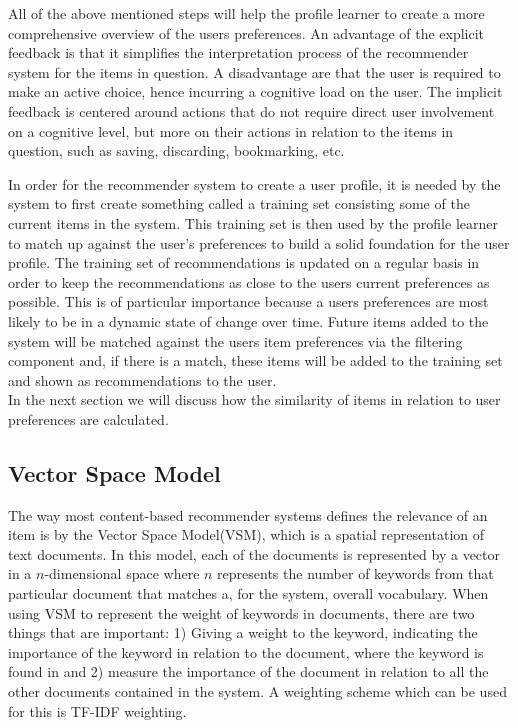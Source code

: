All of the above mentioned steps will help the profile learner to create a more comprehensive overview of the users preferences. An advantage of the explicit feedback is that it simplifies the interpretation process of the recommender system for the items in question. A disadvantage are that the user is required to make an active choice, hence incurring a cognitive load on the user. The implicit feedback is centered around actions that do not require direct user involvement on a cognitive level, but more on their actions in relation to the items in question, such as saving, discarding, bookmarking, etc.\newline

In order for the recommender system to create a user profile, it is needed by the system to first create something called a training set consisting some of the current items in the system. This training set is then used by the profile learner to match up against the user's preferences to build a solid foundation for the user profile. The training set of recommendations is updated on a regular basis in order to keep the recommendations as close to the users current preferences as possible. This is of particular importance because a users preferences are most likely to be in a dynamic state of change over time.\newline
Future items added to the system will be matched against the users item preferences via the filtering component and, if there is a match, these items will be added to the training set and shown as recommendations to the user. \\
In the next section we will discuss how the similarity of items in relation to user preferences are calculated.

\subsection{Vector Space Model}
The way most content-based recommender systems defines the relevance of an item is by the Vector Space Model(VSM), which is a spatial representation of text documents. In this model, each of the documents is represented by a vector in a \(n\)-dimensional space where \(n\) represents the number of keywords from that particular document that matches a, for the system, overall vocabulary.\newline
When using VSM to represent the weight of keywords in documents, there are two things that are important: 1) Giving a weight to the keyword, indicating the importance of the keyword in relation to the document, where the keyword is found in and 2) measure the importance of the document in relation to all the other documents contained in the system. A weighting scheme which can be used for this is TF-IDF weighting. \newline


